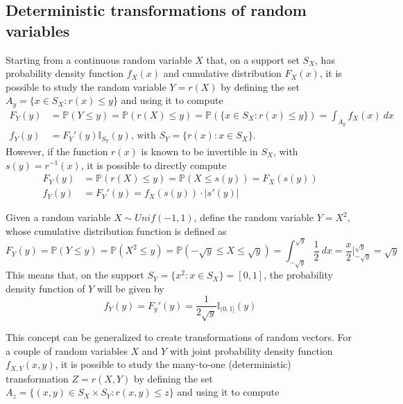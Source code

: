 \documentclass{report}
\begin{document}
\subsection{Deterministic transformations of random variables}
Starting from a continuous random variable $\displaystyle X$ that, on a support set $\displaystyle S_X$, has probability density function $\displaystyle f_X(x)$ and cumulative distribution $\displaystyle F_X(x)$, it is possible to study the random variable $\displaystyle Y = r(X)$ by defining the set $\displaystyle A_y = \{x \in S_X : r(x) \leq y\}$ and using it to compute
\begin{align*}
    F_Y(y) &= \mathbb{P}(Y \leq y) = \mathbb{P}(r(X) \leq y) = \mathbb{P}(\{x \in S_X : r(x) \leq y\}) = \int_{A_y} f_X(x) \ dx \\
    f_Y(y) &= F_Y'(y)\mathbb{I}_{S_Y}(y) \text{, with $S_Y = \{r(x) : x \in S_X\}$.}
\end{align*}
However, if the function $\displaystyle r(x)$ is known to be invertible in $\displaystyle S_X$, with $\displaystyle s(y) = r^{-1}(x)$, it is possible to directly compute
\begin{align*}
    F_Y(y) &= \mathbb{P}(r(X) \leq y) = \mathbb{P}(X \leq s(y)) = F_X(s(y)) \\
    f_Y(y) &= F_Y'(y) = f_X(s(y)) \cdot |s'(y)|
\end{align*}
\begin{examplebox}
    Given a random variable $\displaystyle X \sim Unif(-1, 1)$, define the random variable $\displaystyle Y = X^2$, whose cumulative distribution function is defined as
    \[F_Y(y) = \mathbb{P}(Y \leq y) = \mathbb{P}(X^2 \leq y) = \mathbb{P}(-\sqrt{y} \leq X \leq \sqrt{y}) = \int_{-\sqrt{y}}^{\sqrt{y}} \frac{1}{2} \ dx = \frac{x}{2}\Bigg|_{-\sqrt{y}}^{\sqrt{y}} = \sqrt{y}\]
    This means that, on the support $\displaystyle S_Y = \{x^2 : x \in S_X\} = [0, 1]$, the probability density function of $\displaystyle Y$ will be given by
    \[f_Y(y) = F_y'(y) = \frac{1}{2\sqrt{y}}\mathbb{I}_{(0, 1]}(y)\]
\end{examplebox}
\noindent This concept can be generalized to create transformations of random vectors. \newline
For a couple of random variables $\displaystyle X$ and $\displaystyle Y$ with joint probability density function $\displaystyle f_{X, Y}(x, y)$, it is possible to study the many-to-one (deterministic) transformation $\displaystyle Z = r(X, Y)$ by defining the set $\displaystyle A_z = \{(x, y) \in S_X \times S_Y: r(x, y) \leq z\}$ and using it to compute
\end{document}
